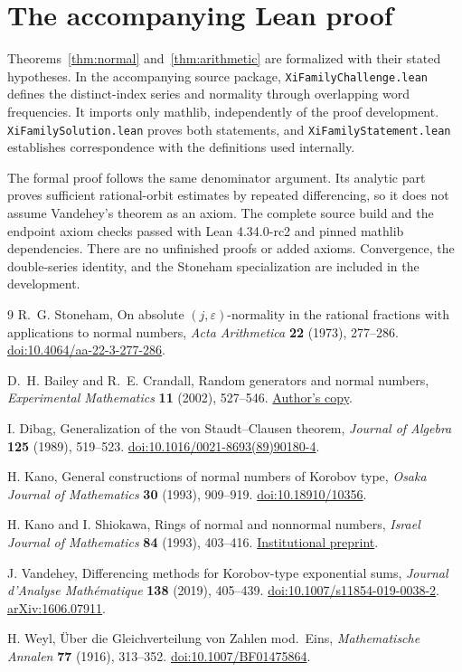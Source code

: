\documentclass[11pt]{article}
\begin{document}
\section*{The accompanying Lean proof}

Theorems~\ref{thm:normal} and~\ref{thm:arithmetic} are formalized
with their stated hypotheses. In the accompanying source package,
\texttt{XiFamilyChallenge.lean} defines the distinct-index series and
normality through overlapping word frequencies. It imports only
mathlib, independently of the proof development.
\texttt{XiFamilySolution.lean} proves both statements, and
\texttt{XiFamilyStatement.lean} establishes correspondence with the
definitions used internally.

The formal proof follows the same denominator argument. Its analytic
part proves sufficient rational-orbit estimates by repeated differencing,
so it does not assume Vandehey's theorem as an axiom. The complete
source build and the endpoint axiom checks passed with Lean
4.34.0-rc2 and pinned mathlib dependencies. There are no unfinished
proofs or added axioms. Convergence, the double-series identity, and
the Stoneham specialization are included in the development.

\begin{thebibliography}{9}
\small
{}
R.~G. Stoneham, On absolute \((j,\varepsilon)\)-normality in the rational
fractions with applications to normal numbers,
\emph{Acta Arithmetica} \textbf{22} (1973), 277--286.
\href{https://doi.org/10.4064/aa-22-3-277-286}{doi:10.4064/aa-22-3-277-286}.

D.~H. Bailey and R.~E. Crandall, Random generators and normal numbers,
\emph{Experimental Mathematics} \textbf{11} (2002), 527--546.
\href{https://www.davidhbailey.com/dhbpapers/bcnormal-em.pdf}{Author's copy}.

I. Dibag, Generalization of the von Staudt--Clausen theorem,
\emph{Journal of Algebra} \textbf{125} (1989), 519--523.
\href{https://doi.org/10.1016/0021-8693(89)90180-4}{doi:10.1016/0021-8693(89)90180-4}.

H. Kano, General constructions of normal numbers of Korobov type,
\emph{Osaka Journal of Mathematics} \textbf{30} (1993), 909--919.
\href{https://doi.org/10.18910/10356}{doi:10.18910/10356}.

H. Kano and I. Shiokawa, Rings of normal and nonnormal numbers,
\emph{Israel Journal of Mathematics} \textbf{84} (1993), 403--416.
\href{https://www.math.keio.ac.jp/wp-content/uploads/2022/03/91006.pdf}{Institutional preprint}.

J. Vandehey, Differencing methods for Korobov-type exponential sums,
\emph{Journal d'Analyse Math\'ematique} \textbf{138} (2019), 405--439.
\href{https://doi.org/10.1007/s11854-019-0038-2}{doi:10.1007/s11854-019-0038-2}.
\href{https://arxiv.org/abs/1606.07911}{arXiv:1606.07911}.

H. Weyl, \"Uber die Gleichverteilung von Zahlen mod.\ Eins,
\emph{Mathematische Annalen} \textbf{77} (1916), 313--352.
\href{https://doi.org/10.1007/BF01475864}{doi:10.1007/BF01475864}.
\end{thebibliography}
\end{document}
